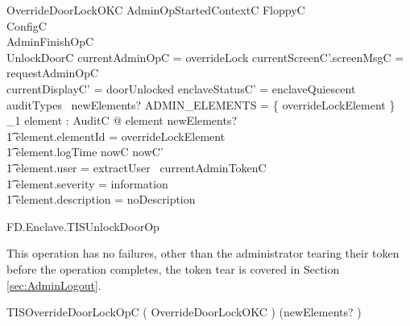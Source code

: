 \begin{schema}{OverrideDoorLockOKC}
        AdminOpStartedContextC
\also   
        \Xi FloppyC
\\      \Xi ConfigC
\\      AdminFinishOpC
\\      UnlockDoorC
\where
        \The currentAdminOpC = overrideLock
\also
        currentScreenC'.screenMsgC = requestAdminOpC
\\      currentDisplayC' = doorUnlocked
\also
        enclaveStatusC' = enclaveQuiescent
\also
        auditTypes~ newElements? \cap ADMIN\_ELEMENTS = 
        \{ overrideLockElement \} 
\also
        \exists_1 element : AuditC @ element \in newElements? 
\\ \t1  \land element.elementId = overrideLockElement
\\ \t1  \land element.logTime \in nowC \upto nowC'
\\ \t1  \land element.user = extractUser~ currentAdminTokenC
\\ \t1  \land element.severity = information
\\ \t1  \land element.description = noDescription
\end{schema}

\begin{traceunit}{FD.Enclave.TISUnlockDoorOp}
\end{traceunit}

This operation has no failures, other than the administrator tearing
their token before the operation completes, the token tear is covered
in Section \ref{sec:AdminLogout}.

\begin{zed}
        TISOverrideDoorLockOpC  ( OverrideDoorLockOKC ) \hide
(newElements? )
\end{zed}



